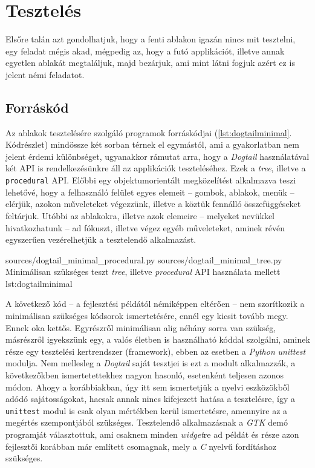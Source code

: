 \section{Tesztelés}

Elsőre talán azt gondolhatjuk, hogy a fenti ablakon igazán nincs mit tesztelni, egy feladat mégis akad, mégpedig az, hogy a futó applikációt, illetve annak egyetlen ablakát megtaláljuk, majd bezárjuk, ami mint látni fogjuk azért ez is jelent némi feladatot.

\subsection{Forráskód}

Az ablakok tesztelésére szolgáló programok forráskódjai (\ref{lst:dogtailminimal}. Kódrészlet) mindössze két sorban térnek el egymástól, ami a gyakorlatban nem jelent érdemi különbséget, ugyanakkor rámutat arra, hogy a \textit{Dogtail} használatával két API is rendelkezésünkre áll az applikációk teszteléséhez. Ezek a \textit{tree}, illetve a \texttt{procedural} API. Előbbi egy objektumorientált megközelítést alkalmazva teszi lehetővé, hogy a felhasználó felület egyes elemeit -- gombok, ablakok, menük -- elérjük, azokon műveleteket végezzünk, illetve a köztük fennálló összefüggéseket feltárjuk. Utóbbi az ablakokra, illetve azok elemeire -- melyeket nevükkel hivatkozhatunk -- ad fókuszt, illetve végez egyéb műveleteket, aminek révén egyszerűen vezérelhetjük a tesztelendő alkalmazást.

\lstdoublepysource
{sources/dogtail_minimal_procedural.py}
{sources/dogtail_minimal_tree.py}
{Minimálisan szükséges teszt \textit{tree}, illetve \textit{procedural} API használata mellett}
{lst:dogtailminimal}

A következő kód -- a fejlesztési példától némiképpen eltérően -- nem szorítkozik a minimálisan szükséges kódsorok ismertetésére, ennél egy kicsit tovább megy. Ennek oka kettős. Egyrészről minimálisan alig néhány sorra van szükség, másrészről igyekszünk egy, a valós életben is használható kóddal szolgálni, aminek része egy tesztelési kertrendszer (framework), ebben az esetben a \textit{Python} \textit{unittest} modulja. Nem mellesleg a \textit{Dogtail} saját tesztjei is ezt a modult alkalmazzák, a következőkben ismertetettekhez nagyon hasonló, esetenként teljesen azonos módon. Ahogy a korábbiakban, úgy itt sem ismertetjük a nyelvi eszközökből adódó sajátosságokat, hacsak annak nincs kifejezett hatása a tesztelésre, így a \texttt{unittest} modul is csak olyan mértékben kerül ismertetésre, amennyire az a megértés szempontjából szükséges. Tesztelendő alkalmazásnak a \textit{GTK} demó programját választottuk, ami csaknem minden \textit{widget}re ad példát és része azon fejlesztői korábban már említett csomagnak, mely a \textit{C} nyelvű fordításhoz szükséges.

